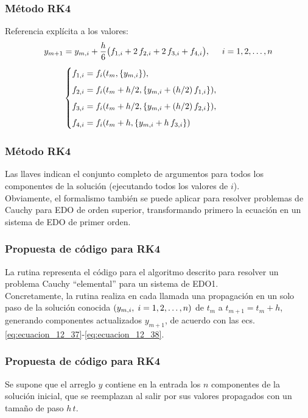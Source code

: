 \begin{frame}
\frametitle{Método RK4}
Referencia explícita a los valores:
\fontsize{12}{12}\selectfont
\begin{align}
y_{m+1} &= y_{m,i} + \dfrac{h}{6} \big( f_{1,i} + 2 \, f_{2,i} + 2 \, f_{3, i} + f_{4, i} \big), \hspace{0.5cm} i = 1, 2, \ldots, n \label{eq:ecuacion_12_37} \\[0.5em]
&\begin{cases}
f_{1, i} = f_{i}(t_{m}, \left\{ y_{m, i} \right\}), \\[0.5em]
f_{2, i} = f_{i}(t_{m} + h/2, \left\{ y_{m, i} + (h/2) \, f_{1,i} \right\}), \\[0.5em]
f_{3, i} = f_{i}(t_{m} + h/2, \left\{ y_{m, i} + (h/2) \, f_{2,i} \right\}), \\[0.5em]
f_{4, i} = f_{i}(t_{m} + h, \left\{ y_{m, i} + h \, f_{3,i} \right\})
\end{cases} \label{eq:ecuacion_12_38}
\end{align}
\end{frame}
\begin{frame}
\frametitle{Método RK4}
Las llaves indican el conjunto completo de argumentos para todos los componentes de la solución (ejecutando todos los valores de $i$).
\\
\bigskip
Obviamente, el formalismo también se puede aplicar para resolver problemas de Cauchy para EDO de orden superior, transformando primero la ecuación en un sistema de EDO de primer orden.
\end{frame}
\begin{frame}
\frametitle{Propuesta de código para RK4}
La rutina  representa el código para el algoritmo descrito para resolver un problema Cauchy \enquote{elemental} para un sistema de EDO1.
\\
\bigskip
Concretamente, la rutina realiza en cada llamada una propagación en un solo paso de la solución conocida $(y_{m, i}, \hspace{0.1cm} i = 1, 2, \ldots, n)$ de $t_{m}$ a $t_{m + 1} = t_{m} + h$, generando componentes actualizados $y_{m + 1}$, de acuerdo con las ecs. \ref{eq:ecuacion_12_37}-\ref{eq:ecuacion_12_38}.
\end{frame}
\begin{frame}
\frametitle{Propuesta de código para RK4}
Se supone que el arreglo $y$ contiene en la entrada los $n$ componentes de la solución inicial, que se reemplazan al salir por sus valores propagados con un tamaño de paso $h \, t$.
\end{frame}

